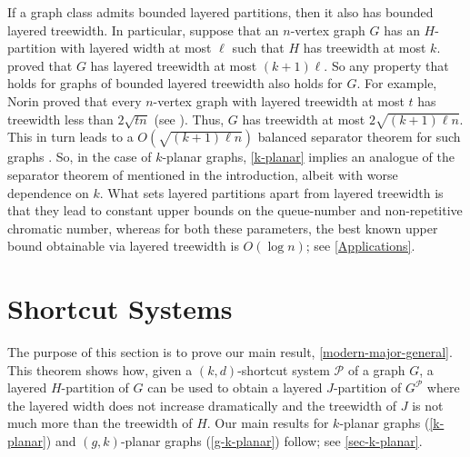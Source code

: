 \documentclass{patmorin}
\begin{document}
If a graph class admits bounded layered partitions, then it also has bounded layered treewidth. In particular, suppose that an $n$-vertex graph $G$ has an $H$-partition with layered width at most $\ell$ such that $H$ has treewidth at most $k$. \citet{dujmovic.joret.ea:planar} proved that $G$ has layered treewidth at most $(k+1)\ell$. So any property that holds for graphs of bounded layered treewidth also holds for $G$. For example, Norin proved that every $n$-vertex graph with layered treewidth at most $t$ has treewidth less than $2\sqrt{tn}$ (see \citep{dujmovic.morin.ea:layered}). Thus, $G$ has treewidth at most $2\sqrt{(k+1)\ell n}$. This in turn leads to a $O(\sqrt{(k+1)\ell n})$ balanced separator theorem for such graphs \citep{RS-II}. So, in the case of $k$-planar graphs, \cref{k-planar} implies an analogue of the separator theorem of \citet{FP08} mentioned in the introduction, albeit with worse dependence on $k$. What sets layered partitions apart from layered treewidth is that they lead to constant upper bounds on the queue-number  and non-repetitive chromatic number, whereas for both these parameters, the best known upper bound obtainable via layered treewidth is $O(\log n)$; see \cref{Applications}. 

%
%



\section{Shortcut Systems}
\label{Structure}

The purpose of this section is to prove our main result, \cref{modern-major-general}. This theorem shows how, given a $(k,d)$-shortcut system $\mathcal{P}$ of a graph $G$, a layered $H$-partition of $G$ can be used to obtain a layered $J$-partition of $G^{\mathcal{P}}$ where the layered width  does not increase dramatically and the treewidth of $J$ is not much more than the treewidth of $H$.  Our main results for $k$-planar graphs (\cref{k-planar}) and $(g,k)$-planar graphs (\cref{g-k-planar}) follow; see \cref{sec-k-planar}.
\end{document}
